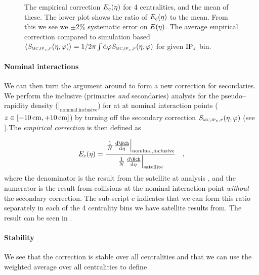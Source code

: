 \begin{figure}[h!tbp]
  \centering
  \caption{ The empirical correction
    $\EmpCor[c]{}$ for 4 centralities, and the mean of these.  The
    lower plot shows the ratio of $\EmpCor[c]{}$ to the mean.  From
    this we see we $\pm2\%$ systematic error on
    $\EmpCor{}$.  The average empirical
    correction compared to simulation based
    $\langle\SecMap\rangle=1/2\pi\int\text{d}\varphi\SecMap{}$ for
    given $\IPz{}$ bin. } 
\end{figure}


\paragraph{Nominal interactions} 
We can then turn the argument around to form a new correction for
secondaries.  We perform the inclusive (primaries \emph{and}
secondaries) analysis for the pseudo--rapidity density
(\ndndeta{}$|_{\text{nominal,inclusive}}$) for \PbPbCol{} at
 at nominal interaction points
($z\in[\unit[-10]{\text{cm}},\unit[+10]{\text{cm}}]$) by turning off
the secondary correction $\SecMap$ (see
).The \emph{empirical correction} is then
defined as

\begin{equation}
  \label{eq:empirical:cent}
  \EmpCor[c]{} = \frac{%
    \left.\ndndeta\right|_{\text{nominal,inclusive}}}{%
    \left.\ndndeta\right|_{\text{satellite}}}\quad,
\end{equation}
where the denominator is the result from the satellite \PbPbCol{} at
 analysis \cite{Abbas:2013bpa}, and the numerator is
the result from collisions at the nominal interaction point
\emph{without} the secondary correction.   The sub-script $c$
indicates that we can form this ratio separately in each of the 4
centrality bins we have satellite results from.  The result can be
seen in . 

\paragraph{Stability}
We see that the correction is stable over all centralities and that we
can use the weighted average over all centralities to define 

